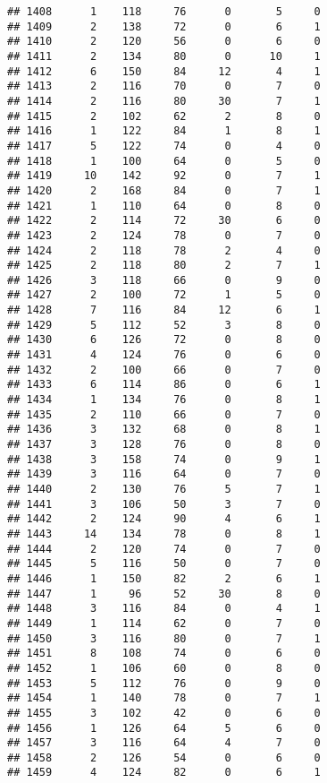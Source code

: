 \documentclass[
]{article}
\begin{document}
\begin{verbatim}
## 1408      1    118     76      0       5     0
## 1409      2    138     72      0       6     1
## 1410      2    120     56      0       6     0
## 1411      2    134     80      0      10     1
## 1412      6    150     84     12       4     1
## 1413      2    116     70      0       7     0
## 1414      2    116     80     30       7     1
## 1415      2    102     62      2       8     0
## 1416      1    122     84      1       8     1
## 1417      5    122     74      0       4     0
## 1418      1    100     64      0       5     0
## 1419     10    142     92      0       7     1
## 1420      2    168     84      0       7     1
## 1421      1    110     64      0       8     0
## 1422      2    114     72     30       6     0
## 1423      2    124     78      0       7     0
## 1424      2    118     78      2       4     0
## 1425      2    118     80      2       7     1
## 1426      3    118     66      0       9     0
## 1427      2    100     72      1       5     0
## 1428      7    116     84     12       6     1
## 1429      5    112     52      3       8     0
## 1430      6    126     72      0       8     0
## 1431      4    124     76      0       6     0
## 1432      2    100     66      0       7     0
## 1433      6    114     86      0       6     1
## 1434      1    134     76      0       8     1
## 1435      2    110     66      0       7     0
## 1436      3    132     68      0       8     1
## 1437      3    128     76      0       8     0
## 1438      3    158     74      0       9     1
## 1439      3    116     64      0       7     0
## 1440      2    130     76      5       7     1
## 1441      3    106     50      3       7     0
## 1442      2    124     90      4       6     1
## 1443     14    134     78      0       8     1
## 1444      2    120     74      0       7     0
## 1445      5    116     50      0       7     0
## 1446      1    150     82      2       6     1
## 1447      1     96     52     30       8     0
## 1448      3    116     84      0       4     1
## 1449      1    114     62      0       7     0
## 1450      3    116     80      0       7     1
## 1451      8    108     74      0       6     0
## 1452      1    106     60      0       8     0
## 1453      5    112     76      0       9     0
## 1454      1    140     78      0       7     1
## 1455      3    102     42      0       6     0
## 1456      1    126     64      5       6     0
## 1457      3    116     64      4       7     0
## 1458      2    126     54      0       6     0
## 1459      4    124     82      0       6     1

\end{verbatim}
\end{document}
